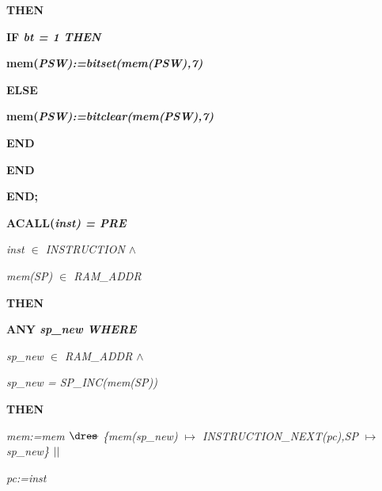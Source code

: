\begin{sloppypar}
\hspace*{0.20in}\bf THEN

\hspace*{0.30in}\bf IF \it bt \rm = \rm 1 \bf THEN

\hspace*{0.40in}\bf mem\rm (\it PSW\rm )\rm :=\it bitset\rm (\it mem\rm (\it PSW\rm )\rm ,\rm 7\rm )

\hspace*{0.30in}\bf ELSE

\hspace*{0.40in}\bf mem\rm (\it PSW\rm )\rm :=\it bitclear\rm (\it mem\rm (\it PSW\rm )\rm ,\rm 7\rm )

\hspace*{0.30in}\bf END

\hspace*{0.20in}\bf END

\hspace*{0.10in}\bf END\rm ;

\hspace*{0.10in}  

\hspace*{0.10in}

\hspace*{0.10in}\bf ACALL\rm (\it inst\rm ) \rm = \bf PRE

\hspace*{0.20in}\it inst $\in$  \it INSTRUCTION  $\land$ 

\hspace*{0.20in}\it mem\rm (\it SP\rm ) $\in$  \it RAM\_ADDR

\hspace*{0.10in}\bf THEN

\hspace*{0.20in}\bf ANY \it sp\_new \bf WHERE

\hspace*{0.30in}\it sp\_new $\in$  \it RAM\_ADDR  $\land$ 

\hspace*{0.30in}\it sp\_new \rm = \it SP\_INC\rm (\it mem\rm (\it SP\rm )\rm )

\hspace*{0.20in}\bf THEN

\hspace*{0.30in}\it mem\rm :=\it mem $\lover$ \rm \{\it mem\rm (\it sp\_new\rm ) $\mapsto$ \it INSTRUCTION\_NEXT\rm (\it pc\rm )\rm ,\it SP $\mapsto$ \it sp\_new\rm \}  $\mbox{$\mid\mid$}$ 

\hspace*{0.30in}\it pc\rm :=\it inst


\end{sloppypar}
